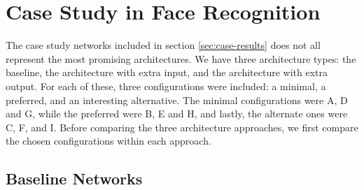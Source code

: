 
\section{Case Study in Face Recognition}

\begin{comment}
RQ 2: How can facial expression data be utilized to improve a face recognition system?

RO 2.1:Investigate what happens when incorporating expression data in a face recognition system.

order of performance, from best to worst: E, F, B, D, C, A, H, G, I
avvik i orden: test acc. er litt høyere i C enn D
avvik i orden: test og val. loss er litt lavere i A enn C
avvik i orden: test og val. loss er litt lavere i I enn G
avvik i orden: test ID acc. er litt høyere i I enn G
avvik i orden: test og val. exp. acc. er litt høyere i I enn G
avvik i orden: test og val. exp. loss er litt lavere i I enn G
avvik i orden: I har faktisk høyest exp. test acc.

for extra output: loss is high, but accuracy isnt THAT bad

The combined metrics of the extra output architecture make it harder to compare to the baseline and extra input architecture.

The extra output architecture underperforms in comparison with the other two, but still manages an impressive accuracy considering it is tackling two problems simultaneously.

comment on separated performance metrics for extra output networks
\end{comment}

The case study networks included in section \ref{sec:case-results} does not all represent the most promising architectures. We have three architecture types: the baseline, the architecture with extra input, and the architecture with extra output. For each of these, three configurations were included: a minimal, a preferred, and an interesting alternative. The minimal configurations were A, D and G, while the preferred were B, E and H, and lastly, the alternate ones were C, F, and I. Before comparing the three architecture approaches, we first compare the chosen configurations within each approach.

\subsection{Baseline Networks}

